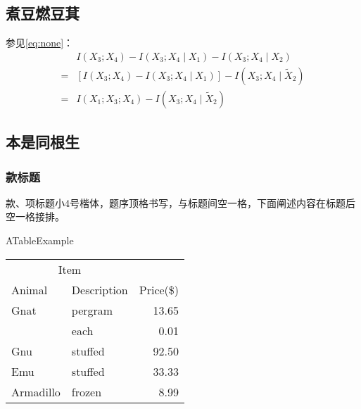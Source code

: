\subsection{煮豆燃豆萁}
\zhlipsum[1-3][name=simp]

参见\cref{eq:none}：
\begin{align}
\label{eq:none}
&I(X_3;X_4)-I(X_3;X_4\mid{}X_1)-I(X_3;X_4\mid{}X_2)\nonumber\\
=&[I(X_3;X_4)-I(X_3;X_4\mid{}X_1)]-I(X_3;X_4\mid{}\tilde{X}_2)\\
=&I(X_1;X_3;X_4)-I(X_3;X_4\mid{}\tilde{X}_2)
\end{align}
\zhlipsum[6-8][name=simp]


\zhlipsum[1-3][name=simp]

\begin{figure}[!htp]
	\centering
	\resizebox{10cm}{!}{}
	\label{fig:flow_chart}
\end{figure}

\subsection{本是同根生}
\zhlipsum[1-3][name=simp]

\subsubsection{款标题}
款、项标题小4号楷体，题序顶格书写，与标题间空一格，下面阐述内容在标题后空一格接排。

\begin{table}[!hpb]
	\centering
	{ATableExample}
	\label{tab:firstone}
	\begin{tabular}{@{}llr@{}}\toprule
		\multicolumn{2}{c}{Item}\\\cmidrule(r){1-2}
		Animal&Description&Price(\$)\\\midrule
		Gnat&pergram&13.65\\
		&each&0.01\\
		Gnu&stuffed&92.50\\
		Emu&stuffed&33.33\\
		Armadillo&frozen&8.99\\\bottomrule
	\end{tabular}
\end{table}

